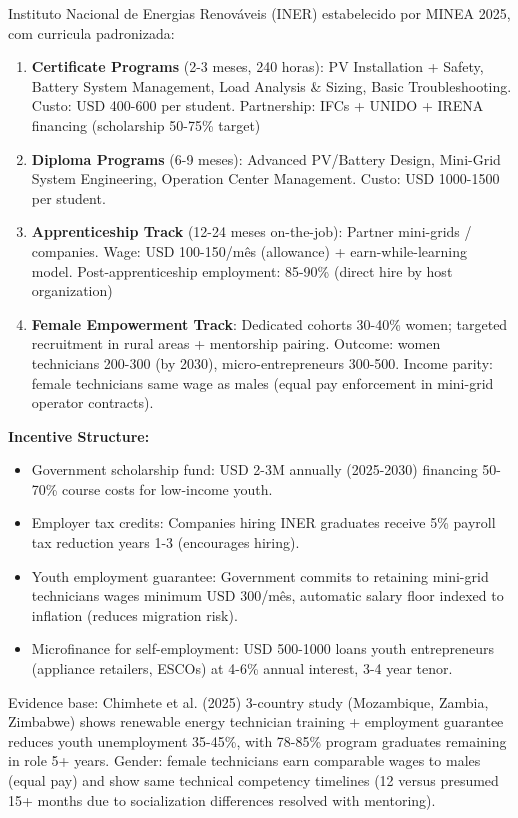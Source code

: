 \documentclass[12pt, a4paper]{article}
\begin{document}
Instituto Nacional de Energias Renováveis (INER) estabelecido por MINEA 2025, com curricula padronizada:
\begin{enumerate}
\item\textbf{Certificate Programs} (2-3 meses, 240 horas): PV Installation + Safety, Battery System Management, Load Analysis \& Sizing, Basic Troubleshooting. Custo: USD 400-600 per student. Partnership: IFCs + UNIDO + IRENA financing (scholarship 50-75\% target)

\item\textbf{Diploma Programs} (6-9 meses): Advanced PV/Battery Design, Mini-Grid System Engineering, Operation Center Management. Custo: USD 1000-1500 per student.

\item\textbf{Apprenticeship Track} (12-24 meses on-the-job): Partner mini-grids / companies. Wage: USD 100-150/mês (allowance) + earn-while-learning model. Post-apprenticeship employment: 85-90\% (direct hire by host organization)

\item\textbf{Female Empowerment Track}: Dedicated cohorts 30-40\% women; targeted recruitment in rural areas + mentorship pairing. Outcome: women technicians 200-300 (by 2030), micro-entrepreneurs 300-500. Income parity: female technicians same wage as males (equal pay enforcement in mini-grid operator contracts).
\end{enumerate}\textbf{Incentive Structure:}
\begin{itemize}
\item Government scholarship fund: USD 2-3M annually (2025-2030) financing 50-70\% course costs for low-income youth. 

\item Employer tax credits: Companies hiring INER graduates receive 5\% payroll tax reduction years 1-3 (encourages hiring).

\item Youth employment guarantee: Government commits to retaining mini-grid technicians wages minimum USD 300/mês, automatic salary floor indexed to inflation (reduces migration risk).

\item Microfinance for self-employment: USD 500-1000 loans youth entrepreneurs (appliance retailers, ESCOs) at 4-6\% annual interest, 3-4 year tenor.
\end{itemize}

Evidence base: Chimhete et al. (2025) 3-country study (Mozambique, Zambia, Zimbabwe) shows renewable energy technician training + employment guarantee reduces youth unemployment 35-45\%, with 78-85\% program graduates remaining in role 5+ years. Gender: female technicians earn comparable wages to males (equal pay) and show same technical competency timelines (12 versus presumed 15+ months due to socialization differences resolved with mentoring).
\end{document}

